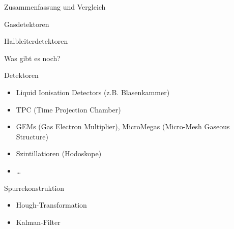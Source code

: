 

\begin{frame}{Zusammenfassung und Vergleich}
	
	\begin{block}{Gasdetektoren}
	\end{block}
	
	\begin{block}{Halbleiterdetektoren}
	
	\end{block}

\end{frame}


\begin{frame}{Was gibt es noch?}
	
	\begin{block}{Detektoren}
		\begin{itemize}
		  \item Liquid Ionisation Detectors (z.B. Blasenkammer)
		  \item TPC (Time Projection Chamber)
		  \item GEMs (Gas Electron Multiplier), MicroMegas (Micro-Mesh Gaseous Structure)
		  \item Szintillatioren (Hodoskope)
		  \item \ldots
		\end{itemize}
	\end{block}
	
		\begin{block}{Spurrekonstruktion}
		\begin{itemize}
		  \item Hough-Transformation
		  \item Kalman-Filter
		\end{itemize}
	\end{block}

\end{frame}